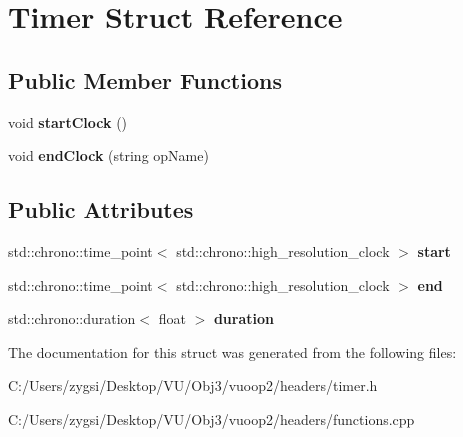 \hypertarget{struct_timer}{}\section{Timer Struct Reference}
\label{struct_timer}
\subsection*{Public Member Functions}
\begin{DoxyCompactItemize}
\item 
\mbox{\label{struct_timer_a844fc970770aff59c3f0311c1700024b}} 
void {\bfseries start\+Clock} ()
\item 
\mbox{\label{struct_timer_a1ee6a9f87b4c0e8239a12646d36d6e92}} 
void {\bfseries end\+Clock} (string op\+Name)
\end{DoxyCompactItemize}
\subsection*{Public Attributes}
\begin{DoxyCompactItemize}
\item 
\mbox{\label{struct_timer_a8a51b74f2bfb71a5ec527d8954ed57d9}} 
std\+::chrono\+::time\+\_\+point$<$ std\+::chrono\+::high\+\_\+resolution\+\_\+clock $>$ {\bfseries start}
\item 
\mbox{\label{struct_timer_a777c54ae81d761f058abd174cd51175d}} 
std\+::chrono\+::time\+\_\+point$<$ std\+::chrono\+::high\+\_\+resolution\+\_\+clock $>$ {\bfseries end}
\item 
\mbox{\label{struct_timer_a7678557711013e0c02d67bb573752856}} 
std\+::chrono\+::duration$<$ float $>$ {\bfseries duration}
\end{DoxyCompactItemize}


The documentation for this struct was generated from the following files\+:\begin{DoxyCompactItemize}
\item 
C\+:/\+Users/zygsi/\+Desktop/\+V\+U/\+Obj3/vuoop2/headers/timer.\+h\item 
C\+:/\+Users/zygsi/\+Desktop/\+V\+U/\+Obj3/vuoop2/headers/functions.\+cpp\end{DoxyCompactItemize}

